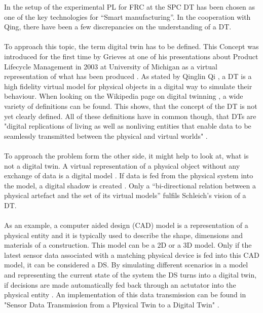 In the setup of the experimental PL for \ac{FRC} at the \ac{SPC} 
\ac{DT} has been chosen as one of the key technologies for “Smart manufacturing”. In the cooperation with Qing, there have been a few discrepancies on the understanding of a \ac{DT}.\\
\\
To approach this topic, the term digital twin has to be defined.
This Concept was introduced for the first time by Grieves at one of his presentations about Product Lifecycle Management in 2003 at University of Michigan as a virtual representation of what has been produced \cite{GreivesDTfirst}.
As stated by Qinglin Qi \cite{Qi2018DigitalTS}, a \ac{DT} is a high fidelity virtual model for physical objects in a digital way to simulate their behaviour. 
When looking on the Wikipedia page on digital twinning \cite{DTwikip}, a wide variety of definitions can be found. 
This shows, that the concept of the \ac{DT} is not yet clearly defined. All of these definitions have in common though, that \acp{DT} are "digital replications of living as well as nonliving entities that 
enable data to be seamlessly transmitted between the physical and virtual worlds" \cite{SaddikDTmultimconv}.\\
\\
To approach the problem form the other side, it might help to look at, what is not a digital twin.
A virtual representation of a physical object without any exchange of data is a digital model \cite{WongWhatisDT}. 
If data is fed from the physical system into the model, a digital shadow is created \cite{KRITZINGER20181016}.
Only a “bi-directional relation between a physical artefact and the set of its virtual models” \cite{SchleichDTshaping} fulfils Schleich's vision of a \ac{DT}.\\
\\
As an example, a computer aided design (CAD) model is a representation of a physical entity and it is typically used to describe the shape, dimensions and materials of a construction. This model can be a 2D or a 3D model. Only if the latest sensor data associated with a matching physical device is fed into this CAD model, it can be considered a DS. \cite{WongWhatisDT} By simulating different scenarios in a model and representing the current state of the system the DS turns into a digital twin, if decisions are made automatically fed back through an actutator into the physical entity \cite{SchleichDTshaping}.
An implementation of this data transmission can be found in "Sensor Data Transmission from a Physical Twin to a Digital Twin" \cite{AlaDTdataTransmission}.\\
